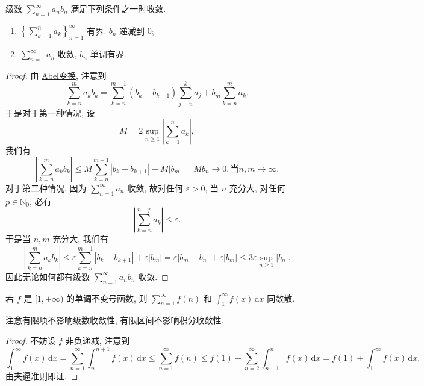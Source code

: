 \documentclass[../../main.tex]{subfiles}%
\begin{document}
\begin{theorem}[A-D判别法]
级数 \( \sum_{n=1}^\infty a_n b_n \) 满足下列条件之一时收敛.
\begin{enumerate}
\item \( \left\{ \sum_{k=1}^n a_k \right\}_{n=1}^\infty \) 有界, \( b_n \) 递减到 \( 0 \);

\item \( \sum_{n=1}^\infty a_n \) 收敛, \( b_n \) 单调有界.
\end{enumerate}
\end{theorem}
\begin{proof}

由 \hyperref[theorem:Abel变换]{Abel变换}, 注意到
\[
\sum_{k=n}^m a_k b_k = \sum_{k=n}^{m - 1} (b_k - b_{k + 1}) \sum_{j=n}^k a_j + b_m \sum_{k=n}^m a_k.
\]
于是对于第一种情况, 设
\[
M = 2 \sup_{n \geqslant 1} \left| \sum_{k=1}^n a_k \right|,
\]
我们有
\[
\left| \sum_{k=n}^m a_k b_k \right| \leqslant M \sum_{k=n}^{m - 1} |b_k - b_{k + 1}| + M |b_m| = M b_n \to 0, \text{当} n, m \to \infty.
\]
对于第二种情况, 因为 \( \sum_{n=1}^\infty a_n \) 收敛, 故对任何 \( \varepsilon > 0 \), 当 \( n \) 充分大, 对任何 \( p \in \mathbb{N}_0 \), 必有
\[
\left| \sum_{k=n}^{n + p} a_k \right| \leqslant \varepsilon.
\]
于是当 \( n, m \) 充分大, 我们有
\[
\left| \sum_{k=n}^m a_k b_k \right| \leqslant \varepsilon \sum_{k=n}^{m - 1} |b_k - b_{k + 1}| + \varepsilon |b_m| = \varepsilon |b_m - b_n| + \varepsilon |b_m| \leqslant 3 \varepsilon \sup_{n \geqslant 1} |b_n|.
\]
因此无论如何都有级数 \( \sum_{n=1}^\infty a_n b_n \) 收敛.

\end{proof}

\begin{theorem}[积分判别法]\label{theorem:积分判别法}
若 \( f \) 是 \( [1, +\infty) \) 的单调不变号函数, 则 \( \sum_{n=1}^\infty f(n) \) 和 \( \int_1^\infty f(x) \, \mathrm{d}x \) 同敛散.
\end{theorem}
\begin{note}
注意有限项不影响级数收敛性, 有限区间不影响积分收敛性.
\end{note}
\begin{proof}

不妨设 \( f \) 非负递减, 注意到
\[
\int_1^\infty f(x) \, \mathrm{d}x = \sum_{n=1}^\infty \int_n^{n + 1} f(x) \, \mathrm{d}x \leqslant \sum_{n=1}^\infty f(n) \leqslant f(1) + \sum_{n=2}^\infty \int_{n - 1}^n f(x) \, \mathrm{d}x = f(1) + \int_1^\infty f(x) \, \mathrm{d}x.
\]
由夹逼准则即证.

\end{proof}
\end{document}
